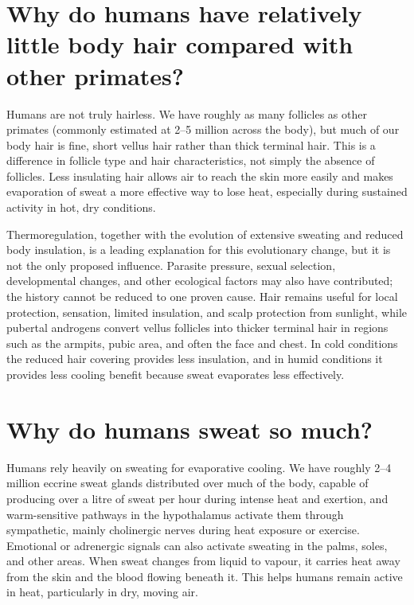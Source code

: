 \documentclass[11pt,oneside]{report}
\begin{document}
\section{Why do humans have relatively little body hair compared with other primates?}

Humans are not truly hairless. We have roughly as many follicles as other
primates (commonly estimated at 2--5 million across the body), but much of our
body hair is fine, short vellus hair rather than thick terminal hair. This is a difference in follicle type and hair characteristics,
not simply the absence of follicles. Less insulating hair allows air to reach
the skin more easily and makes evaporation of sweat a more effective way to
lose heat, especially during sustained activity in hot, dry conditions.

Thermoregulation, together with the evolution of extensive sweating and reduced
body insulation, is a leading explanation for this evolutionary change, but it
is not the only proposed influence. Parasite pressure, sexual selection,
developmental changes, and other ecological factors may also have contributed;
the history cannot be reduced to one proven cause. Hair remains useful for
local protection, sensation, limited insulation, and scalp protection from
sunlight, while pubertal androgens convert vellus follicles into thicker
terminal hair in regions such as the armpits, pubic area, and often the face
and chest. In cold
conditions the reduced hair covering provides less insulation, and in humid
conditions it provides less cooling benefit because sweat evaporates less
effectively.

\section{Why do humans sweat so much?}

Humans rely heavily on sweating for evaporative cooling. We have roughly 2--4 million eccrine
sweat glands distributed over much of the body, capable of producing over a
litre of sweat per hour during intense heat and exertion, and warm-sensitive
pathways in the hypothalamus activate them through sympathetic, mainly
cholinergic nerves during heat exposure or exercise. Emotional or adrenergic signals can also
activate sweating in the palms, soles, and other areas. When sweat changes from
liquid to vapour, it carries heat away from the skin and the blood flowing
beneath it. This helps humans remain active in heat, particularly in dry,
moving air.
\end{document}
